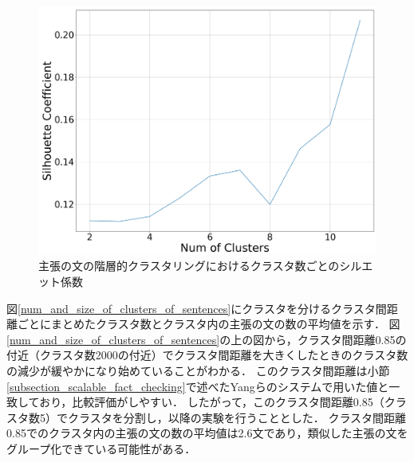 \documentclass[12pt,a4j]{jreport}
\begin{document}
\begin{figure}[H]
	\centering
	\includegraphics[keepaspectratio, width=120mm]{img/process-07_sentences-cluster_from-cluster-230_with-threshold-85_num-of-clusters-dependency-on-silhouette-coefficient_reduced-data-to-5000_Trim.png}
	\caption{主張の文の階層的クラスタリングにおけるクラスタ数ごとのシルエット係数}
	\label{sentences_silhouette}
\end{figure}

図\ref{num_and_size_of_clusters_of_sentences}にクラスタを分けるクラスタ間距離ごとにまとめたクラスタ数とクラスタ内の主張の文の数の平均値を示す．
図\ref{num_and_size_of_clusters_of_sentences}の上の図から，クラスタ間距離0.85の付近（クラスタ数2000の付近）でクラスタ間距離を大きくしたときのクラスタ数の減少が緩やかになり始めていることがわかる．
このクラスタ間距離は小節\ref{subsection_scalable_fact_checking}で述べたYangらのシステムで用いた値と一致しており，比較評価がしやすい\cite{yang_scalable_2021}．
したがって，このクラスタ間距離0.85（クラスタ数5）でクラスタを分割し，以降の実験を行うこととした．
クラスタ間距離0.85でのクラスタ内の主張の文の数の平均値は2.6文であり，類似した主張の文をグループ化できている可能性がある．
\end{document}

